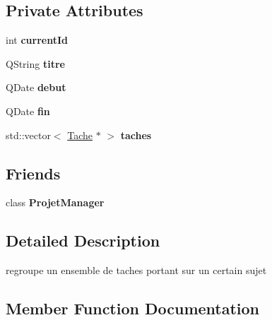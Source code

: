 \subsection*{Private Attributes}
\begin{DoxyCompactItemize}
\item 
\hypertarget{class_projet_af1f9ce3fef8c4f42cd75e3491df38558}{}int {\bfseries current\+Id}\label{class_projet_af1f9ce3fef8c4f42cd75e3491df38558}

\item 
\hypertarget{class_projet_a9759849c856c2ac63f94751b876fd289}{}Q\+String {\bfseries titre}\label{class_projet_a9759849c856c2ac63f94751b876fd289}

\item 
\hypertarget{class_projet_a601015604334a856bb761d30ed816768}{}Q\+Date {\bfseries debut}\label{class_projet_a601015604334a856bb761d30ed816768}

\item 
\hypertarget{class_projet_af91ffd192889109af2b212d39b5b6917}{}Q\+Date {\bfseries fin}\label{class_projet_af91ffd192889109af2b212d39b5b6917}

\item 
\hypertarget{class_projet_ade04f0da5af2565b1dc57cfaa1dde6e6}{}std\+::vector$<$ \hyperlink{class_tache}{Tache} $\ast$ $>$ {\bfseries taches}\label{class_projet_ade04f0da5af2565b1dc57cfaa1dde6e6}

\end{DoxyCompactItemize}
\subsection*{Friends}
\begin{DoxyCompactItemize}
\item 
\hypertarget{class_projet_aaaed9857b3481233fa7c581b5c86151d}{}class {\bfseries Projet\+Manager}\label{class_projet_aaaed9857b3481233fa7c581b5c86151d}

\end{DoxyCompactItemize}


\subsection{Detailed Description}
regroupe un ensemble de taches portant sur un certain sujet 

\subsection{Member Function Documentation}
\hypertarget{class_projet_a81773cdbd069096d98190acf02875113}{}
